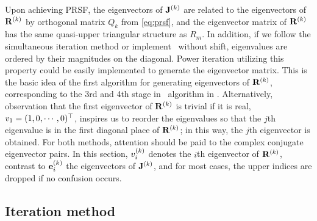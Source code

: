 Upon achieving PRSF,
the eigenvectors of $\ps{\jMps}{k}$ are related to the eigenvectors of
$\ps{R}{k}$ by orthogonal matrix $Q_{k}$ from \eqref{eq:prsf}, and
the
eigenvector matrix of $\ps{R}{k}$ has the same quasi-upper triangular
structure as $R_m$. In addition, if we follow the
simultaneous iteration method or
implement \psd\ without shift, eigenvalues are ordered by their
magnitudes on the diagonal. Power iteration utilizing this property
could be easily implemented to generate the eigenvector
matrix. This is the basic idea of the first algorithm for generating
eigenvectors of $\ps{R}{k}$, corresponding to the 3rd and 4th stage in
{\cLv\ algorithm} in .
Alternatively,
observation that
the first eigenvector of $\ps{R}{k}$ is trivial if it is real,
$\Rve{1}=(1,0,\cdots,0)^\top $, inspires us to reorder the
eigenvalues so that the $j$th eigenvalue is in the first diagonal
place of $\ps{R}{k}$; in this way, the $j$th eigenvector is obtained.
For both methods, attention should be paid to the complex conjugate
eigenvector pairs. In this section, $\Rve{i}^{(k)}$
denotes the $i$th eigenvector of $\ps{R}{k}$, contrast to
$\jEigvec[i]^{(k)}$
the eigenvectors of $\ps{J}{k}$, and for most cases, the upper indices
are dropped if no confusion occurs.

\subsection{Iteration method}

